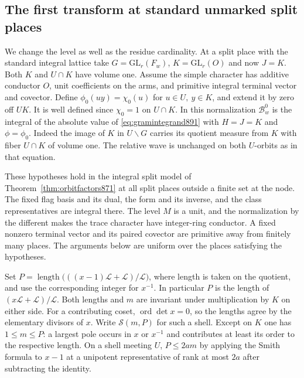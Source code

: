\documentclass[a4paper,11pt]{article}
\theoremstyle{definition}
\theoremstyle{remark}
\numberwithin{equation}{section}
\begin{document}
\subsection{The first transform at standard unmarked split places}
\label{sec:standardfirst899}

We change the level as well as the residue cardinality. At a split
place with the standard integral lattice take \(G=\mathrm{GL}_r(F_w)\),
\(K=\mathrm{GL}_r(O)\) and now \(J=K\). Both \(K\) and \(U\cap K\)
have volume one. Assume the simple character has additive conductor
\(O\), unit coefficients on the arms, and primitive integral
terminal vector and covector. Define
\(\phi_0(uy)=\chi_0(u)\) for \(u\in U,\ y\in K\), and extend it
by zero off \(UK\). It is well defined since \(\chi_0=1\) on
\(U\cap K\). In this normalization \(\mathcal B^0_w\) is the
integral of the absolute value of \eqref{eq:gramintegrand891}
with \(H=J=K\) and \(\phi=\phi_0\). Indeed the image of \(K\) in
\(U\backslash G\) carries its quotient measure from \(K\) with
fiber \(U\cap K\) of volume one. The relative wave is unchanged
on both \(U\)-orbits as in that equation.

These hypotheses hold in the integral split model of
Theorem~\ref{thm:orbitfactors871} at all split places outside a
finite set at the node. The fixed flag basis and its dual, the
form and its inverse, and the class representatives are integral
there. The level \(M\) is a unit, and the normalization by the
different makes the trace character have integer-ring conductor.
A fixed nonzero terminal vector and its paired covector are
primitive away from finitely many places. The arguments below
are uniform over the places satisfying the hypotheses.

Set \(P=\operatorname{length}\big(((x-1)\mathcal L+\mathcal L)/\mathcal L\big)\),
where length is taken on the quotient, and use the corresponding
integer for \(x^{-1}\). In particular \(P\) is the length of
\((x\mathcal L+\mathcal L)/\mathcal L\). Both lengths and \(m\)
are invariant under multiplication by \(K\) on either side.
For a contributing coset, \(\operatorname{ord}\det x=0\), so the
lengths agree by the elementary divisors of \(x\). Write
\(\mathcal S(m,P)\) for such a shell. Except on \(K\) one has
\(1\le m\le P\): a largest pole occurs in \(x\) or \(x^{-1}\)
and contributes at least its order to the respective length.
On a shell meeting \(U\), \(P\le2am\) by applying the Smith
formula to \(x-1\) at a unipotent representative of rank at
most \(2a\) after subtracting the identity.
\end{document}
